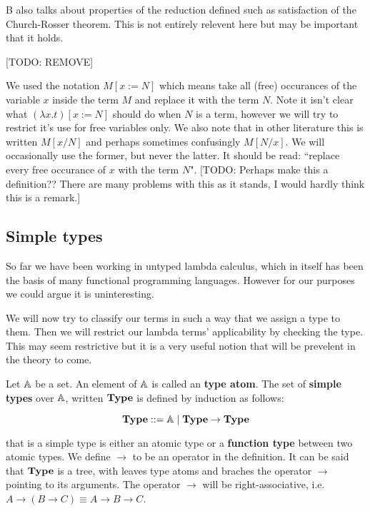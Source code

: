 \begin{remark}
B also talks about properties of the reduction defined such as satisfaction of the Church-Rosser theorem. This is not entirely relevent here but may be important that it holds.
\end{remark}

[TODO: REMOVE]
\begin{remark} 
    We used the notation $M[x:= N]$ which means take all (free) occurances of the variable $x$ inside the term $M$ and replace it with the term $N$. Note it isn't clear what $(\lambda x . t)[x := N]$ should do when $N$ is a term, however we will try to restrict it's use for free variables only. We also note that in other literature this is written $M[x/N]$ and perhaps sometimes confusingly $M[N/x]$. We will occasionally use the former, but never the latter. It should be read: ``replace every free occurance of $x$ with the term $N$". [TODO: Perhaps make this a definition?? There are many problems with this as it stands, I would hardly think this is a remark.]
\end{remark}

\subsection{Simple types}

So far we have been working in untyped lambda calculus, which in itself has been the basis of many functional programming languages. However for our purposes we could argue it is uninteresting.

We will now try to classify our terms in such a way that we assign a type to them. Then we will restrict our lambda terms' applicability by checking the type. This may seem restrictive but it is a very useful notion that will be prevelent in the theory to come.

\begin{defin}

Let $\mathbb{A}$ be a set. An element of $\mathbb{A}$ is called an {\bf type atom}. The set of {\bf simple types} over $\mathbb{A}$, written $\mathbf{Type}$ is defined by induction as follows:

\[
\mathbf{Type} ::= \mathbb{A} \mid \mathbf{Type} \to \mathbf{Type}
\]

that is a simple type is either an atomic type or a {\bf function type} between two atomic types. We define $\to$ to be an operator in the definition. It can be said that $\mathbf{Type}$ is a tree, with leaves type atoms and braches the operator $\to$ pointing to its arguments. The operator $\to$ will be right-associative, i.e. $A \to (B \to C)\equiv A \to B \to C$.
\end{defin}


